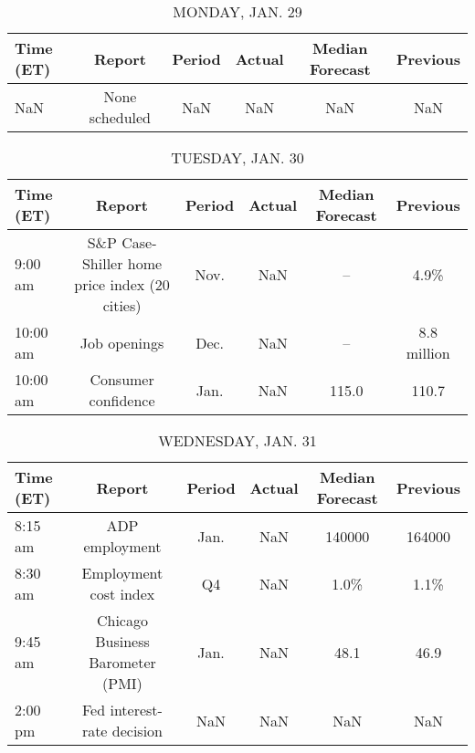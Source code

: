 \documentclass{article}%
\begin{document}
%
\normalsize%


\begin{table}[htbp]%
\caption{MONDAY, JAN. 29}%
\centering%
\begin{adjustbox}{width=1\textwidth}%
\begin{tabular}{lccccc}
\toprule
Time (ET) &         Report & Period & Actual & Median Forecast & Previous \\
\midrule
      NaN & None scheduled &    NaN &    NaN &             NaN &      NaN \\
\bottomrule
\end{tabular}
%
\end{adjustbox}%
\end{table}

%


\begin{table}[htbp]%
\caption{TUESDAY, JAN. 30}%
\centering%
\begin{adjustbox}{width=1\textwidth}%
\begin{tabular}{lccccc}
\toprule
Time (ET) &                                        Report & Period & Actual & Median Forecast &    Previous \\
\midrule
  9:00 am & S\&P Case-Shiller home price index (20 cities) &   Nov. &    NaN &              -- &        4.9\% \\
 10:00 am &                                  Job openings &   Dec. &    NaN &              -- & 8.8 million \\
 10:00 am &                           Consumer confidence &   Jan. &    NaN &           115.0 &       110.7 \\
\bottomrule
\end{tabular}
%
\end{adjustbox}%
\end{table}

%


\begin{table}[htbp]%
\caption{WEDNESDAY, JAN. 31}%
\centering%
\begin{adjustbox}{width=1\textwidth}%
\begin{tabular}{lccccc}
\toprule
Time (ET) &                           Report & Period & Actual & Median Forecast & Previous \\
\midrule
  8:15 am &                   ADP employment &   Jan. &    NaN &          140000 &   164000 \\
  8:30 am &            Employment cost index &     Q4 &    NaN &            1.0\% &     1.1\% \\
  9:45 am & Chicago Business Barometer (PMI) &   Jan. &    NaN &            48.1 &     46.9 \\
  2:00 pm &       Fed interest-rate decision &    NaN &    NaN &             NaN &      NaN \\
\bottomrule
\end{tabular}
%
\end{adjustbox}%
\end{table}
\end{document}
